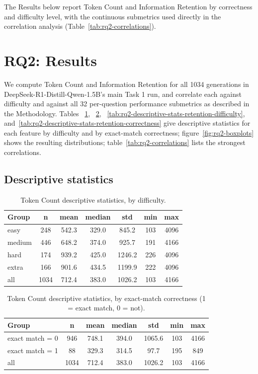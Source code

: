 The Results below report Token Count and Information Retention by correctness and difficulty level, with the continuous submetrics used directly in the correlation analysis (Table~\ref{tab:rq2-correlations}).


\section{RQ2: Results}
\label{sec:rq2-results}

We compute Token Count and Information Retention for all 1034 generations in DeepSeek-R1-Distill-Qwen-1.5B's main Task 1 run, and correlate each against difficulty and against all 32 per-question performance submetrics as described in the Methodology. Tables ~\ref{tab:rq2-descriptive-stats-tokencount-difficulty}, ~\ref{tab:rq2-descriptive-stats-tokencount-correctness}, ~\ref{tab:rq2-descriptive-stats-retention-difficulty}, and~\ref{tab:rq2-descriptive-stats-retention-correctness} give descriptive statistics for each feature by difficulty and by exact-match correctness; figure~\ref{fig:rq2-boxplots} shows the resulting distributions; table~\ref{tab:rq2-correlations} lists the strongest correlations.

\subsection{Descriptive statistics}
\label{sec:rq2-descriptive-stats}


\begin{table}[H]
\centering
\footnotesize
\caption{Token Count descriptive statistics, by difficulty.}
\label{tab:rq2-descriptive-stats-tokencount-difficulty}
\begin{tabular}{lcccccc}
\toprule
Group & n & mean & median & std & min & max \\
\midrule
easy & 248 & 542.3 & 329.0 & 845.2 & 103 & 4096 \\
medium & 446 & 648.2 & 374.0 & 925.7 & 191 & 4166 \\
hard & 174 & 939.2 & 425.0 & 1246.2 & 226 & 4096 \\
extra & 166 & 901.6 & 434.5 & 1199.9 & 222 & 4096 \\
\midrule
all & 1034 & 712.4 & 383.0 & 1026.2 & 103 & 4166 \\
\bottomrule
\end{tabular}
\end{table}

\begin{table}[H]
\centering
\footnotesize
\caption{Token Count descriptive statistics, by exact-match correctness (1 = exact match, 0 = not).}
\label{tab:rq2-descriptive-stats-tokencount-correctness}
\begin{tabular}{lcccccc}
\toprule
Group & n & mean & median & std & min & max \\
\midrule
exact match = 0 & 946 & 748.1 & 394.0 & 1065.6 & 103 & 4166 \\
exact match = 1 & 88 & 329.3 & 314.5 & 97.7 & 195 & 849 \\
\midrule
all & 1034 & 712.4 & 383.0 & 1026.2 & 103 & 4166 \\
\bottomrule
\end{tabular}
\end{table}

